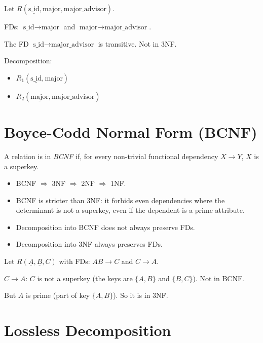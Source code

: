 \begin{example}
Let $R(\underline{\text{s\_id}}, \text{major}, \text{major\_advisor})$.

FDs: $\text{s\_id} \to \text{major}$ and $\text{major} \to \text{major\_advisor}$.

The FD $\text{s\_id} \to \text{major\_advisor}$ is transitive. Not in 3NF.

Decomposition:
\begin{itemize}
    \item $R_1(\underline{\text{s\_id}}, \text{major})$
    \item $R_2(\underline{\text{major}}, \text{major\_advisor})$
\end{itemize}
\end{example}

\section{Boyce-Codd Normal Form (BCNF)}

\begin{definition}[BCNF]
A relation is in \emph{BCNF} if, for every non-trivial functional dependency
$X \to Y$, $X$ is a superkey.
\end{definition}

\begin{theorem}[BCNF vs.\ 3NF]
\begin{itemize}
    \item BCNF $\Rightarrow$ 3NF $\Rightarrow$ 2NF $\Rightarrow$ 1NF.
    \item BCNF is stricter than 3NF: it forbids even dependencies where the
          determinant is not a superkey, even if the dependent is a prime attribute.
    \item Decomposition into BCNF does not always preserve FDs.
    \item Decomposition into 3NF always preserves FDs.
\end{itemize}
\end{theorem}

\begin{example}
Let $R(\underline{A}, \underline{B}, C)$ with FDs: $AB \to C$ and $C \to A$.

$C \to A$: $C$ is not a superkey (the keys are $\{A, B\}$ and $\{B, C\}$).
Not in BCNF.

But $A$ is prime (part of key $\{A, B\}$). So it is in 3NF.
\end{example}

\section{Lossless Decomposition}

